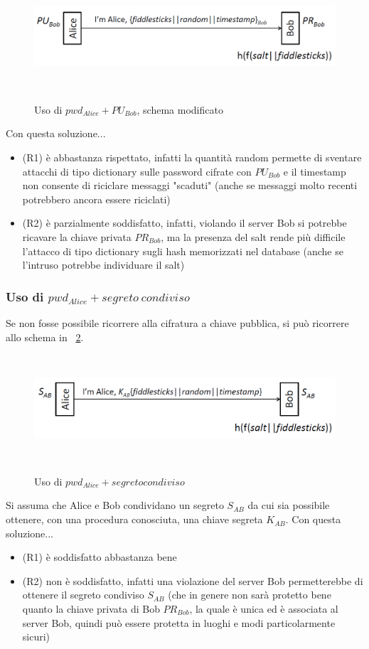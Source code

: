 \begin{figure}[htbp]
	\centering%
	\subfigure%
	{\includegraphics[height=4cm, width=12cm, keepaspectratio]{Immagini/autenticazione/ImgS39.png}}
	\caption{Uso di $pwd_{Alice} + PU_{Bob}$, schema modificato\label{fig:ImgS39}} 	
\end{figure}
Con questa soluzione...
\begin{itemize}
	\item (R1) è abbastanza rispettato, infatti la quantità random permette di sventare attacchi di tipo dictionary sulle password cifrate con $PU_{Bob}$ e il timestamp non consente di riciclare messaggi "scaduti" (anche se messaggi molto recenti potrebbero ancora essere riciclati)
	\item (R2) è parzialmente soddisfatto, infatti, violando il server Bob si potrebbe ricavare la chiave privata $PR_{Bob}$, ma la presenza del salt rende più difficile l'attacco di tipo dictionary sugli hash memorizzati nel database (anche se l'intruso potrebbe individuare il salt)
\end{itemize}
\subsubsection{Uso di $pwd_{Alice} + segreto \: condiviso$}
Se non fosse possibile ricorrere alla cifratura a chiave pubblica, si può ricorrere allo schema in \figurename~\ref{fig:ImgS42}.
\begin{figure}[htbp]
	\centering%
	\subfigure%
	{\includegraphics[height=4cm, width=12cm, keepaspectratio]{Immagini/autenticazione/ImgS42.png}}
	\caption{Uso di $pwd_{Alice} + segreto condiviso$\label{fig:ImgS42}} 	
\end{figure}
Si assuma che Alice e Bob condividano un segreto $S_{AB}$ da cui sia possibile ottenere, con una procedura conosciuta, una chiave segreta $K_{AB}$.
Con questa soluzione...
\begin{itemize}
	\item (R1) è soddisfatto abbastanza bene
	\item (R2) non è soddisfatto, infatti una violazione del server Bob permetterebbe di ottenere il segreto condiviso $S_{AB}$ (che in genere non sarà protetto bene quanto la chiave privata di Bob $PR_{Bob}$, la quale è unica ed è associata al server Bob, quindi può essere protetta in luoghi e modi particolarmente sicuri)
\end{itemize}
